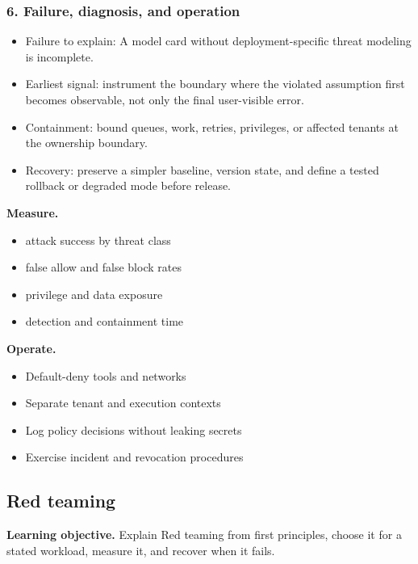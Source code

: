 \subsubsection*{6. Failure, diagnosis, and operation}
\begin{itemize}
\item Failure to explain: A model card without deployment-specific threat modeling is incomplete.
\item Earliest signal: instrument the boundary where the violated assumption first becomes observable, not only the final user-visible error.
\item Containment: bound queues, work, retries, privileges, or affected tenants at the ownership boundary.
\item Recovery: preserve a simpler baseline, version state, and define a tested rollback or degraded mode before release.
\end{itemize}
\textbf{Measure.}\begin{itemize}
\item attack success by threat class
\item false allow and false block rates
\item privilege and data exposure
\item detection and containment time
\end{itemize}
\textbf{Operate.}\begin{itemize}
\item Default-deny tools and networks
\item Separate tenant and execution contexts
\item Log policy decisions without leaking secrets
\item Exercise incident and revocation procedures
\end{itemize}
\subsection{Red teaming}
\textbf{Learning objective.} Explain Red teaming from first principles, choose it for a stated workload, measure it, and recover when it fails.
